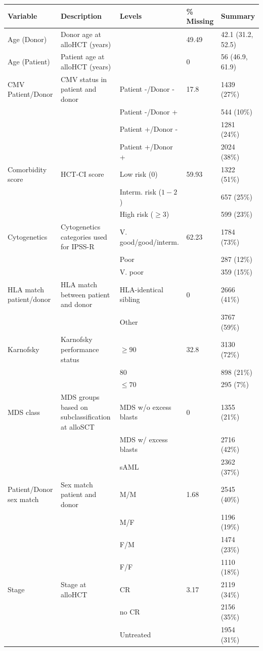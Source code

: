 \documentclass[
  letterpaper,
  paper=240mm:170mm,
  twoside=true,
  open=right,
  fontsize=10pt,
  pagesize=false,
  BCOR=15mm,
  DIV=14,
  headinclude=true,
  footinclude=false,
  headsepline=on]{scrbook}
\begin{document}
\begin{longtable}[t]{>{\raggedright\arraybackslash}p{7em}>{\raggedright\arraybackslash}p{10em}lll}
\toprule
Variable & Description & Levels & \% Missing & Summary\\
\midrule
Age (Donor) & Donor age at alloHCT (years) &  & 49.49 & 42.1 (31.2, 52.5)\\
Age (Patient) & Patient age at alloHCT (years) &  & 0 & 56 (46.9, 61.9)\\
CMV Patient/Donor & CMV status in patient and donor & Patient -/Donor - & 17.8 & 1439 (27\%)\\
 &  & Patient -/Donor + &  & 544 (10\%)\\
 &  & Patient +/Donor - &  & 1281 (24\%)\\
 &  & Patient +/Donor + &  & 2024 (38\%)\\
Comorbidity score & HCT-CI score & Low risk (0) & 59.93 & 1322 (51\%)\\
 &  & Interm. risk ($1-2$) &  & 657 (25\%)\\
 &  & High risk ($\geq3$) &  & 599 (23\%)\\
Cytogenetics & Cytogenetics categories used for IPSS-R & V. good/good/interm. & 62.23 & 1784 (73\%)\\
 &  & Poor &  & 287 (12\%)\\
 &  & V. poor &  & 359 (15\%)\\
HLA match patient/donor & HLA match between patient and donor & HLA-identical sibling & 0 & 2666 (41\%)\\
 &  & Other &  & 3767 (59\%)\\
Karnofsky & Karnofsky performance status & $\geq90$ & 32.8 & 3130 (72\%)\\
 &  & 80 &  & 898 (21\%)\\
 &  & $\leq70$ &  & 295 (7\%)\\
MDS class & MDS groups based on subclassification at alloSCT & MDS w/o excess blasts & 0 & 1355 (21\%)\\
 &  & MDS w/ excess blasts &  & 2716 (42\%)\\
 &  & sAML &  & 2362 (37\%)\\
Patient/Donor sex match & Sex match patient and donor & M/M & 1.68 & 2545 (40\%)\\
 &  & M/F &  & 1196 (19\%)\\
 &  & F/M &  & 1474 (23\%)\\
 &  & F/F &  & 1110 (18\%)\\
Stage & Stage at alloHCT & CR & 3.17 & 2119 (34\%)\\
 &  & no CR &  & 2156 (35\%)\\
 &  & Untreated &  & 1954 (31\%)\\
\bottomrule

\end{longtable}
\end{document}
